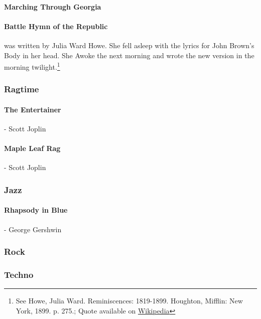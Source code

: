 				\paragraph{Marching Through Georgia}
				\paragraph{Battle Hymn of the Republic} was written by Julia Ward Howe.  She fell asleep with the lyrics for John Brown's Body in her head.  She Awoke the next morning and wrote the new version in the morning twilight.\footnote{See Howe, Julia Ward. Reminiscences: 1819-1899. Houghton, Mifflin: New York, 1899. p. 275.; Quote available on \href{https://en.wikipedia.org/wiki/Battle_Hymn_of_the_Republic\#Creation_of_the_"Battle_Hymn"}{Wikipedia}}
				
			\subsubsection{Ragtime}
				\paragraph{The Entertainer} - Scott Joplin
				\paragraph{Maple Leaf Rag} - Scott Joplin
				
			\subsubsection{Jazz}
				\paragraph{Rhapsody in Blue} - George Gershwin
			
			\subsubsection{Rock}
			
			\subsubsection{Techno}
				
			